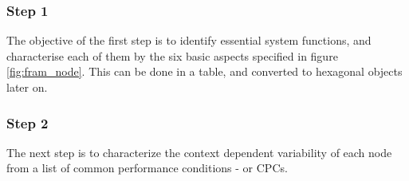 \subsubsection*{Step 1}
The objective of the first step is to identify essential system functions, and characterise each of them by the six basic aspects specified in figure \ref{fig:fram_node}. This can be done in a table, and converted to hexagonal objects later on.
\subsubsection*{Step 2}
The next step is to characterize the context dependent variability of each node from a list of common performance conditions - or CPCs. 



